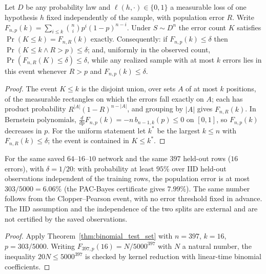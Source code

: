 \begin{theorem}\label{thm:binomial_test_set}
\leanok
Let $D$ be any probability law and $\ell(h,\cdot)\in\{0,1\}$ a measurable loss
of one hypothesis $h$ fixed independently of the sample, with population error
$R$. Write $F_{n,p}(k)=\sum_{i\le k}\binom ni p^i(1-p)^{n-i}$. Under
$S\sim D^n$ the error count $K$ satisfies $\Pr(K\le k)=F_{n,R}(k)$ exactly.
Consequently: if $F_{n,p}(k)\le\delta$ then
$\Pr(K\le k \wedge R>p)\le\delta$; and, uniformly in the observed count,
$\Pr(F_{n,R}(K)\le\delta)\le\delta$, while any realized sample with at most
$k$ errors lies in this event whenever $R>p$ and $F_{n,p}(k)\le\delta$.
\end{theorem}
\begin{proof}
\leanok
The event $K\le k$ is the disjoint union, over sets $A$ of at most $k$
positions, of the measurable rectangles on which the errors fall exactly on
$A$; each has product probability $R^{|A|}(1-R)^{n-|A|}$, and grouping by
$|A|$ gives $F_{n,R}(k)$. In Bernstein polynomials,
$\frac{d}{dp}F_{n,p}(k)=-n\,b_{n-1,k}(p)\le0$ on $[0,1]$, so $F_{n,p}(k)$
decreases in $p$. For the uniform statement let $k^*$ be the largest $k\le n$
with $F_{n,R}(k)\le\delta$; the event is contained in $K\le k^*$.
\end{proof}

\begin{lemma}\label{lem:binomial_mlp_certificate}
\leanok
{}
For the same saved $64$--$16$--$10$ network and the same $397$ held-out rows
($16$ errors), with $\delta=1/20$: with probability at least $95\%$ over IID
held-out observations independent of the training rows, the population error
is at most $303/5000=6.06\%$ (the PAC-Bayes certificate gives $7.99\%$). The
same number follows from the Clopper--Pearson event, with no error threshold
fixed in advance. The IID assumption and the independence of the two splits
are external and are not certified by the saved observations.
\end{lemma}
\begin{proof}
\leanok
Apply Theorem~\ref{thm:binomial_test_set} with $n=397$, $k=16$,
$p=303/5000$. Writing $F_{397,p}(16)=N/5000^{397}$ with $N$ a natural number,
the inequality $20N\le5000^{397}$ is checked by kernel reduction with
linear-time binomial coefficients.
\end{proof}

